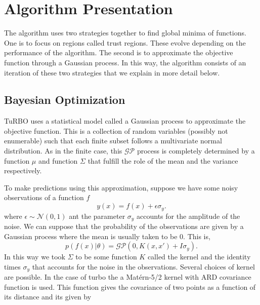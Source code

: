 \documentclass[sigconf]{acmart}
\begin{document}




\maketitle

\section{Algorithm Presentation}

The algorithm uses two strategies together to find global minima of functions. One is to focus on regions called trust regions. These evolve depending on the performance of the algorithm. The second is to approximate the objective function through a Gaussian process. In this way, the algorithm consists of an iteration of these two strategies that we explain in more detail below.


\subsection{Bayesian Optimization}

TuRBO uses a statistical model called a Gaussian process to approximate the objective function. This is a collection of random variables (possibly not enumerable) such that each finite subset follows a multivariate normal distribution. As in the finite case, this $\mathcal{GP}$ process is completely determined by a function $\mu$ and function $\Sigma$ that fulfill the role of the mean and the variance respectively.

To make predictions using this approximation, suppose we have some noisy observations of a function $f$ $$y(x) = f(x)+ \epsilon \sigma_y.$$ where $\epsilon \sim \mathcal{N}(0,1)$ ant the parameter $\sigma_y$ accounts for the amplitude of the noise. We can suppose that the probability of the observations are given by a Gaussian process where the mean is usually taken to be 0. This is, 
\begin{equation*}
    p(f(x)|\theta) = \mathcal{GP}(0,K(x,x') + I\sigma_y).
\end{equation*}
In this way we took $\Sigma$ to be some function $K$ called the kernel and the identity times $\sigma_y$ that accounts for the noise in the observations. Several choices of kernel are possible. In the case of turbo the a Matérn-5/2 kernel with ARD covariance function is used. This function gives the covariance of two points as a function of its distance and its given by
\end{document}
